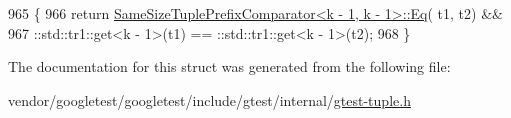 \begin{DoxyCode}
965                                                      \{
966     \textcolor{keywordflow}{return} \hyperlink{namespacetesting_a0cb8ba7eae844c871eccb29e7c81635f}{SameSizeTuplePrefixComparator<k - 1, k - 1>::Eq}(
      t1, t2) &&
967         ::std::tr1::get<k - 1>(t1) == ::std::tr1::get<k - 1>(t2);
968   \}
\end{DoxyCode}


The documentation for this struct was generated from the following file\+:\begin{DoxyCompactItemize}
\item 
vendor/googletest/googletest/include/gtest/internal/\hyperlink{gtest-tuple_8h}{gtest-\/tuple.\+h}\end{DoxyCompactItemize}
